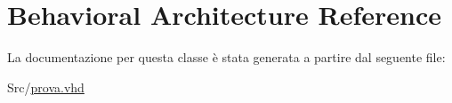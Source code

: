 \hypertarget{classprova_1_1_behavioral}{\section{Behavioral Architecture Reference}
\label{classprova_1_1_behavioral}
}


La documentazione per questa classe è stata generata a partire dal seguente file\+:\begin{DoxyCompactItemize}
\item 
Src/\hyperlink{prova_8vhd}{prova.\+vhd}\end{DoxyCompactItemize}
